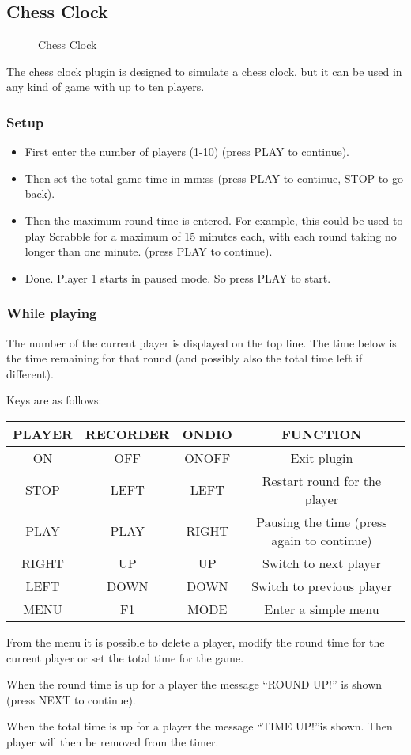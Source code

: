 \subsection{Chess Clock}
\begin{figure}[h]
\begin{center}
\end{center}
\caption{Chess Clock}
\end{figure}

The chess clock plugin is designed  to
simulate a chess clock, but it can be used
in any kind of game with up to ten players.

\subsubsection{Setup}

\begin{itemize}
\item First enter the number of players (1{}-10) (press  PLAY to
continue). 
\item Then set the total game time in mm:ss (press PLAY to continue,
STOP to go back). 
\item Then the maximum round time is entered.  For example, this could
be used  to play Scrabble for a maximum of 15 minutes each, with each
round taking no longer than one minute. (press  PLAY to continue). 
\item Done. Player 1 starts in paused mode. So press PLAY to start.
\end{itemize}

\subsubsection{While playing}
The number of the current player is displayed on the top line. The time
below is the time remaining for that round (and possibly also the total
time left if different). 

Keys are as follows:

\begin{table}[h!]
\begin{center}
\begin{tabular}{|c|c|c|c|}
\hline
PLAYER & RECORDER & ONDIO & FUNCTION \\\hline
ON & OFF & ONOFF & Exit plugin \\\hline
STOP & LEFT & LEFT & Restart round for the player \\\hline
PLAY & PLAY & RIGHT & Pausing the time (press again to continue) \\\hline
RIGHT & UP & UP & Switch to next player \\\hline
LEFT & DOWN & DOWN & Switch to previous player \\\hline
MENU & F1 & MODE & Enter a simple menu \\\hline
\end{tabular}
\end{center}
\end{table}
From the menu it is possible to delete a player, modify the round time
for the current player or set the total time for the game. 

When the round time is up for a player the message ``ROUND UP!'' is shown (press  NEXT to continue). 

When the total time is up for a player the message ``TIME UP!''is shown. Then player will  then be removed from the timer. 


